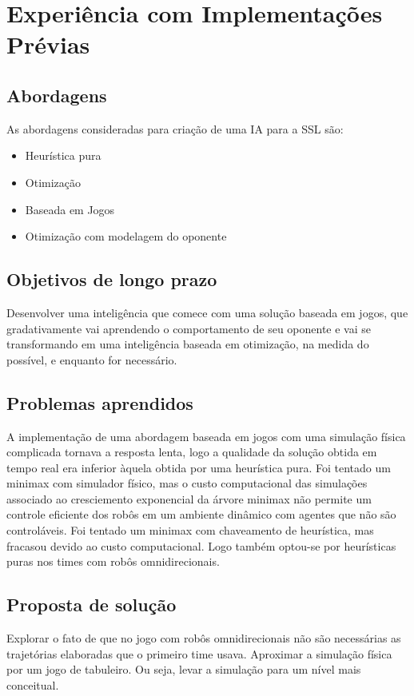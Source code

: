 \chapter{Experiência com Implementações Prévias}

\section{Abordagens}

As abordagens consideradas para criação de uma IA para a SSL são:
\begin{itemize}
 \item Heurística pura
 \item Otimização
 \item Baseada em Jogos
 \item Otimização com modelagem do oponente
\end{itemize}

\section{Objetivos de longo prazo}
Desenvolver uma inteligência que comece com uma solução baseada em jogos, que
gradativamente vai aprendendo o comportamento de seu oponente e vai se
transformando em uma inteligência baseada em otimização, na medida do possível, e
enquanto for necessário.

\section{Problemas aprendidos}
A implementação de uma abordagem baseada em jogos com uma simulação física complicada
tornava a resposta lenta, logo a qualidade da solução obtida em tempo real era inferior
àquela obtida por uma heurística pura.
Foi tentado um minimax com simulador físico, mas o custo computacional das simulações
associado ao cresciemento exponencial da árvore minimax não permite um controle eficiente
dos robôs em um ambiente dinâmico com agentes que não são controláveis.
Foi tentado um minimax com chaveamento de heurística, mas fracasou devido ao
custo computacional. Logo também optou-se por heurísticas puras nos
times com robôs omnidirecionais.

\section{Proposta de solução}
Explorar o fato de que no jogo com robôs omnidirecionais não são necessárias as
trajetórias elaboradas que o primeiro time usava.
Aproximar a simulação física por um jogo de tabuleiro. Ou seja, levar a simulação para um
nível mais conceitual.

